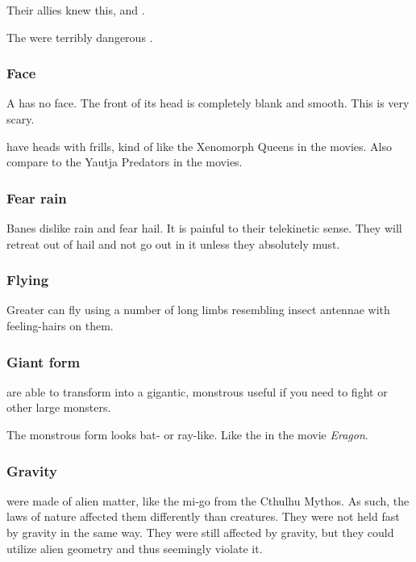 Their \resphan allies knew this, and . 

The \banes{} were terribly dangerous . 





\subsubsection{Face}
A \bane{} has no face.
The front of its head is completely blank and smooth. 
This is very scary.

\Banelords{} have \armoured heads with frills, kind of like the Xenomorph Queens in the  movies. 
Also compare to the Yautja Predators in the  movies. 




\subsubsection{Fear rain}
Banes dislike rain and fear hail.
It is painful to their telekinetic sense.
They will retreat out of hail and not go out in it unless they absolutely must.






\subsubsection{Flying}
Greater \banes can fly using a number of long limbs resembling insect antennae with feeling-hairs on them.





\subsubsection{Giant form}
\Banelords{} are able to transform into a gigantic, monstrous \dash useful if you need to fight \dragons{} or other large monsters. 

The monstrous form looks bat- or ray-like. Like the  in the movie \emph{Eragon}. 





\subsubsection{Gravity}
\Banes were made of alien matter, like the mi-go from the Cthulhu Mythos. 
As such, the laws of nature affected them differently than \Miithian creatures. 
They were not held fast by gravity in the same way.
They were still affected by gravity, but they could utilize alien geometry and thus seemingly violate it. 

